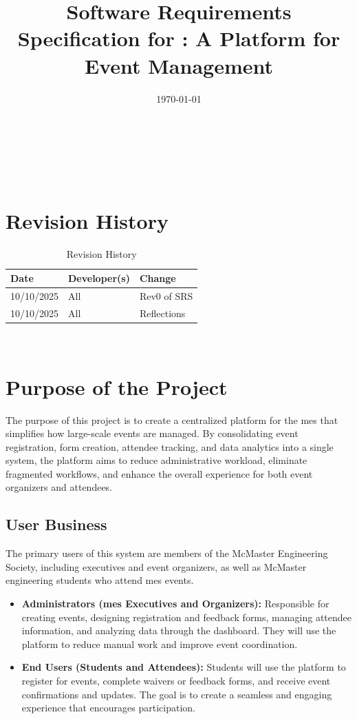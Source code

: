 \documentclass[12pt]{article}
\begin{document}
\title{Software Requirements Specification for \progname: A Platform for Event Management }
\author{\authname}
\date{\today}
	
\maketitle
~\newpage

\tableofcontents

~\newpage

\section*{Revision History}
\begin{table}[hp]
\begin{tabularx}{\textwidth}{llX}
\toprule
\textbf{Date} & \textbf{Developer(s)} & \textbf{Change}\\
\midrule
10/10/2025 & All & Rev0 of SRS\\
10/10/2025 & All & Reflections \\
\bottomrule
\end{tabularx}
\caption{Revision History} \label{TblRevisionHistory}
\end{table}


~\newpage
\section{Purpose of the Project}

The purpose of this project is to create a centralized platform for the \gls{mes} that simplifies how large-scale events
are managed. By consolidating event registration, form creation, attendee tracking, and data analytics into a single
system, the platform aims to reduce administrative workload, eliminate fragmented workflows, and enhance the overall
experience for both event organizers and attendees.

\subsection{User Business}

The primary users of this system are members of the McMaster Engineering Society, including executives and event
organizers, as well as McMaster engineering students who attend \gls{mes} events.

\begin{itemize}
    \item \textbf{Administrators (\gls{mes} Executives and Organizers):} Responsible for creating events, designing
      registration and feedback forms, managing attendee information, and analyzing data through the dashboard. They
      will use the platform to reduce manual work and improve event coordination.
    \item \textbf{End Users (Students and Attendees):} Students will use the platform to register for events, complete
      waivers or feedback forms, and receive event confirmations and updates. The goal is to create a seamless and
      engaging experience that encourages participation.
\end{itemize}
\end{document}
